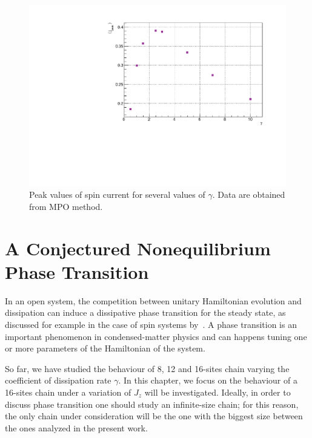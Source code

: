 \begin{figure}[H]
    \centering
    \includegraphics[scale=0.7]{Figures/PeakValueSpinCurrVSgamma_8sites.pdf}
    \captionsetup{width=1.\linewidth}
    \caption{Peak values of spin current for several values of $\gamma$. Data are obtained from MPO method.}
    \label{fig:PeakValueSpinCurrVSgamma_8sites}
\end{figure}


\section{A Conjectured Nonequilibrium Phase Transition}
\label{chapt4_phase_trans}

In an open system, the competition between unitary Hamiltonian evolution and dissipation can induce a dissipative phase transition for the steady state, as discussed for example in the case of spin systems by~\cite{phase_trans_spin_system}.
A phase transition is an important phenomenon in condensed-matter physics and can happens tuning one or more parameters of the Hamiltonian of the system. 

So far, we have studied the behaviour of 8, 12 and 16-sites chain varying the coefficient of dissipation rate $\gamma$. In this chapter, we focus on the behaviour of a 16-sites chain under a variation of $J_z$ will be investigated. Ideally, in order to discuss phase transition one should study an infinite-size chain; for this reason, the only chain under consideration will be the one with the biggest size between the ones analyzed in the present work.


